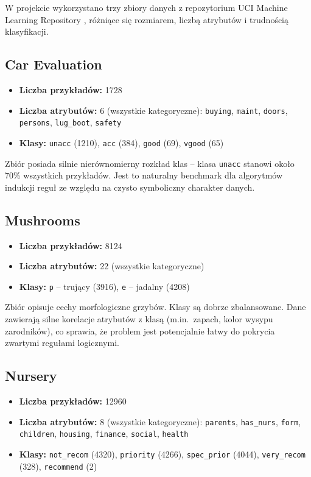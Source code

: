 \documentclass[12pt,a4paper]{article}
\begin{document}
W projekcie wykorzystano trzy zbiory danych z repozytorium UCI Machine Learning
Repository \cite{dua2019}, różniące się rozmiarem, liczbą atrybutów i trudnością klasyfikacji.

\subsection{Car Evaluation}

\begin{itemize}
  \item \textbf{Liczba przykładów:} 1728
  \item \textbf{Liczba atrybutów:} 6 (wszystkie kategoryczne):
        \texttt{buying}, \texttt{maint}, \texttt{doors},
        \texttt{persons}, \texttt{lug\_boot}, \texttt{safety}
  \item \textbf{Klasy:} \texttt{unacc} (1210), \texttt{acc} (384),
        \texttt{good} (69), \texttt{vgood} (65)
\end{itemize}

Zbiór posiada silnie nierównomierny rozkład klas -- klasa \texttt{unacc} stanowi
około 70\% wszystkich przykładów. Jest to naturalny benchmark dla algorytmów
indukcji reguł ze względu na czysto symboliczny charakter danych.

\subsection{Mushrooms}

\begin{itemize}
  \item \textbf{Liczba przykładów:} 8124
  \item \textbf{Liczba atrybutów:} 22 (wszystkie kategoryczne)
  \item \textbf{Klasy:} \texttt{p} -- trujący (3916), \texttt{e} -- jadalny (4208)
\end{itemize}

Zbiór opisuje cechy morfologiczne grzybów. Klasy są dobrze zbalansowane.
Dane zawierają silne korelacje atrybutów z klasą (m.in.\ zapach, kolor wysypu
zarodników), co sprawia, że problem jest potencjalnie łatwy do pokrycia zwartymi
regułami logicznymi.

\subsection{Nursery}

\begin{itemize}
  \item \textbf{Liczba przykładów:} 12960
  \item \textbf{Liczba atrybutów:} 8 (wszystkie kategoryczne):
        \texttt{parents}, \texttt{has\_nurs}, \texttt{form}, \texttt{children},
        \texttt{housing}, \texttt{finance}, \texttt{social}, \texttt{health}
  \item \textbf{Klasy:} \texttt{not\_recom} (4320), \texttt{priority} (4266),
        \texttt{spec\_prior} (4044), \texttt{very\_recom} (328),
        \texttt{recommend} (2)
\end{itemize}
\end{document}
